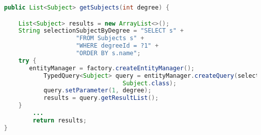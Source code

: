 \begin{lstlisting}[language=Java,  basicstyle=\footnotesize]
public List<Subject> getSubjects(int degree) {

	List<Subject> results = new ArrayList<>();
	String selectionSubjectByDegree = "SELECT s" +
					"FROM Subjects s" + 
					"WHERE degreeId = ?1" +
					"ORDER BY s.name";
	try {
	   entityManager = factory.createEntityManager();
           TypedQuery<Subject> query = entityManager.createQuery(selectionSubjectByDegree,
							 	 Subject.class);
           query.setParameter(1, degree);
           results = query.getResultList();
	} 
        ...
        return results;
}
\end{lstlisting}